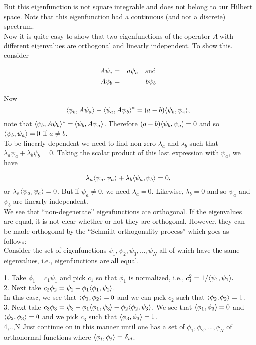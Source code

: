 But this eigenfunction is not square integrable and does not belong to our Hilbert space. Note that this eigenfunction had a continuous (and not
a discrete) spectrum.\\

Now it is quite easy to show that two eigenfunctions of the operator $A$ with different eigenvalues are orthogonal and linearly independent. To 
show this, consider 

\begin{eqnarray*}
A \psi_a&=&a \psi_a \quad \hbox{and} \\
A \psi_b&=&b \psi_b\\
\end{eqnarray*} 

Now
\[ \langle \psi_b, A \psi_a\rangle - \langle \psi_a, A\psi_b\rangle^* = (a - b)\langle \psi_b,\psi_a\rangle,\]
note that $\langle \psi_b,A\psi_b\rangle^* = \langle \psi_b,A\psi_a\rangle$. Therefore
$(a-b)\langle \psi_b,\psi_a\rangle = 0$ and so $\langle \psi_b,\psi_a\rangle = 0$ if $a\ne b$. \\

To be linearly dependent we need to find non-zero $\lambda_a$ and $\lambda_b$ such that $\lambda_a \psi_a + \lambda_b \psi_b = 0$. 
Taking the scalar product of this last expression with $\psi_a$, we have 

\[ \lambda_a \langle \psi_a,\psi_a\rangle + \lambda_b \langle \psi_a,\psi_b\rangle = 0,\] or $\lambda_a \langle \psi_a,\psi_a\rangle = 0$. But if $\psi_a\ne 0$, we need
$\lambda_a = 0$. Likewise, $\lambda_b = 0$ and so $\psi_a$ and $\psi_b$ are linearly independent. \\

We see that ``non-degenerate'' eigenfunctions are orthogonal. If the eigenvalues are equal, it is not clear whether or not they are orthogonal. However,
they can be made orthogonal by the 	``Schmidt orthogonality process'' which goes as follows:\\

Consider the set of eigenfunctions $\psi_1, \psi_2, \psi_3,..., \psi_N$ all of which have the same eigenvalues, i.e., eigenfunctions are all equal.

1. Take $\phi_1 = c_1 \psi_1$  and pick $c_1$ so that $\phi_1$ is normalized, i.e., $c_1^2 = 1/\langle \psi_1,\psi_1\rangle.$\\
2. Next take $c_2 \phi_2 = \psi_2 - \phi_1\langle \phi_1,\psi_2\rangle$.\\
In this case, we see that $\langle \phi_1,\phi_2\rangle = 0$ and we can pick $c_2$ such that $\langle \phi_2,\phi_2\rangle = 1$.\\
3. Next take $c_3 \phi_3 = \psi_3 - \phi_1\langle \phi_1,\psi_3\rangle - \phi_2\langle \phi_2,\psi_3\rangle$. We see that $\langle \phi_1,\phi_3\rangle = 0$ and $\langle \phi_2,\phi_3\rangle = 0$
and we pick $c_3$ such that $\langle \phi_3,\phi_3\rangle = 1$.\\
4,..,N Just continue on in this manner until one has a set of $\phi_1, \phi_2,..., \phi_N$ of orthonormal functions where $\langle \phi_i, \phi_j\rangle = \delta_{ij}$.   
   